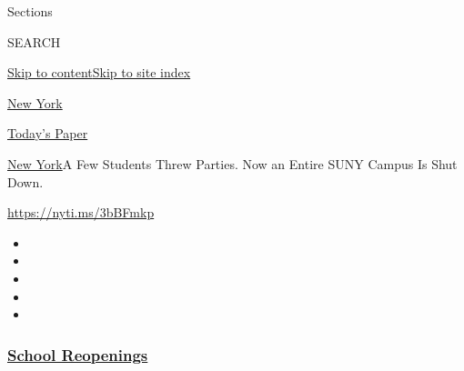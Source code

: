 Sections

SEARCH

\protect\hyperlink{site-content}{Skip to
content}\protect\hyperlink{site-index}{Skip to site index}

\href{https://www.nytimes3xbfgragh.onion/section/nyregion}{New York}

\href{https://myaccount.nytimes3xbfgragh.onion/auth/login?response_type=cookie\&client_id=vi}{}

\href{https://www.nytimes3xbfgragh.onion/section/todayspaper}{Today's
Paper}

\href{/section/nyregion}{New York}\textbar{}A Few Students Threw
Parties. Now an Entire SUNY Campus Is Shut Down.

\url{https://nyti.ms/3bBFmkp}

\begin{itemize}
\item
\item
\item
\item
\item
\end{itemize}

\hypertarget{school-reopenings}{%
\subsubsection{\texorpdfstring{\href{https://www.nytimes3xbfgragh.onion/spotlight/schools-reopening?name=styln-coronavirus-schools-reopening\&region=TOP_BANNER\&block=storyline_menu_recirc\&action=click\&pgtype=Article\&impression_id=90765760-f4c9-11ea-8835-87be5503a188\&variant=undefined}{School
Reopenings}}{School Reopenings}}\label{school-reopenings}}

